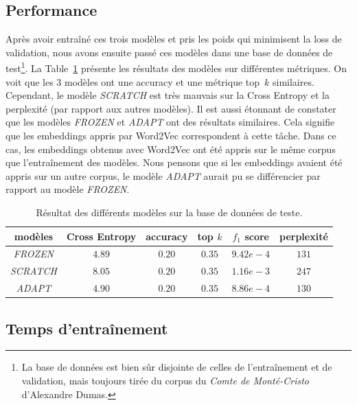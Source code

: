 \documentclass[a4paper]{article}
\begin{document}
\subsection{Performance}

Après avoir entraîné ces trois modèles et pris les poids qui minimisent la loss de validation, nous avons ensuite passé ces modèles dans 
une base de données de test\footnote{La base de données est bien sûr disjointe de celles de l'entraînement et de validation, mais toujours
tirée du corpus du \textit{Comte de Monté-Cristo} d'Alexandre  Dumas.}. La Table~\ref{tab:test} présente les résultats des modèles sur 
différentes métriques. On voit que les 3 modèles ont une accuracy et une métrique top~$k$ similaires. Cependant, le modèle \textit{SCRATCH} 
est très mauvais sur la Cross Entropy et la perplexité (par rapport aux autres modèles). Il est aussi étonnant de constater que les modèles
\textit{FROZEN} et \textit{ADAPT} ont des résultats similaires. Cela signifie que les embeddings appris par Word2Vec correspondent à cette tâche.
Dans ce cas, les embeddings obtenus avec Word2Vec ont été appris sur le même corpus que l'entraînement des modèles. Nous pensons que si 
les embeddings avaient été appris sur un autre corpus, le modèle \textit{ADAPT} aurait  pu se différencier par rapport au modèle \textit{FROZEN}.


\begin{table}[ht]
    \centering
    \begin{tabular}{|c|c|c|c|c|c|}
        \hline
        modèles & Cross Entropy & accuracy & top $k$ & $f_1$ score & perplexité \\
        \hline
        \textit{FROZEN} & $4.89$ &  $0.20$ & $0.35$ & $9.42e-4$ & $131$ \\
        \textit{SCRATCH} & $8.05$ &  $0.20$ & $0.35$ & $1.16e-3$ & $247$ \\
        \textit{ADAPT} & $4.90$ &  $0.20$ & $0.35$ & $8.86e-4$ & $130$ \\
        \hline
    \end{tabular}
    \caption{Résultat des différents modèles sur la base de données de teste.}
    \label{tab:test}
\end{table}

\subsection{Temps d'entraînement}
\end{document}
